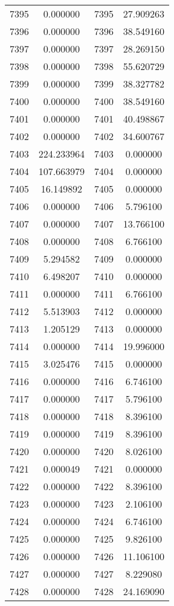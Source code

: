 \documentclass[12pt]{article}
\begin{document}
\begin{longtable}{@{}cccc@{}}
7395 & 0.000000 & 7395 & 27.909263 \\
7396 & 0.000000 & 7396 & 38.549160 \\
7397 & 0.000000 & 7397 & 28.269150 \\
7398 & 0.000000 & 7398 & 55.620729 \\
7399 & 0.000000 & 7399 & 38.327782 \\
7400 & 0.000000 & 7400 & 38.549160 \\
7401 & 0.000000 & 7401 & 40.498867 \\
7402 & 0.000000 & 7402 & 34.600767 \\
7403 & 224.233964 & 7403 & 0.000000 \\
7404 & 107.663979 & 7404 & 0.000000 \\
7405 & 16.149892 & 7405 & 0.000000 \\
7406 & 0.000000 & 7406 & 5.796100 \\
7407 & 0.000000 & 7407 & 13.766100 \\
7408 & 0.000000 & 7408 & 6.766100 \\
7409 & 5.294582 & 7409 & 0.000000 \\
7410 & 6.498207 & 7410 & 0.000000 \\
7411 & 0.000000 & 7411 & 6.766100 \\
7412 & 5.513903 & 7412 & 0.000000 \\
7413 & 1.205129 & 7413 & 0.000000 \\
7414 & 0.000000 & 7414 & 19.996000 \\
7415 & 3.025476 & 7415 & 0.000000 \\
7416 & 0.000000 & 7416 & 6.746100 \\
7417 & 0.000000 & 7417 & 5.796100 \\
7418 & 0.000000 & 7418 & 8.396100 \\
7419 & 0.000000 & 7419 & 8.396100 \\
7420 & 0.000000 & 7420 & 8.026100 \\
7421 & 0.000049 & 7421 & 0.000000 \\
7422 & 0.000000 & 7422 & 8.396100 \\
7423 & 0.000000 & 7423 & 2.106100 \\
7424 & 0.000000 & 7424 & 6.746100 \\
7425 & 0.000000 & 7425 & 9.826100 \\
7426 & 0.000000 & 7426 & 11.106100 \\
7427 & 0.000000 & 7427 & 8.229080 \\
7428 & 0.000000 & 7428 & 24.169090 \\

\end{longtable}
\end{document}
